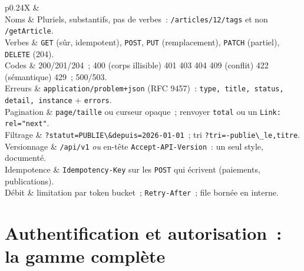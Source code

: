 \begin{tabz}{p{0.24\textwidth}X}
  \headrow {} \&  \\
  \midrule
  Noms \& Pluriels, substantifs, pas de verbes~: \verb|/articles/12/tags| et non \verb|/getArticle|. \\
  Verbes \& \verb|GET| (s\^ur, idempotent), \verb|POST|, \verb|PUT| (remplacement), \verb|PATCH| (partiel), \verb|DELETE| (204). \\
  Codes \& 200/201/204~; 400 (corps illisible) 401 403 404 409 (conflit) 422 (s\'emantique) 429~; 500/503. \\
  Erreurs \& \verb|application/problem+json| (RFC 9457)~: \verb|type, title, status, detail, instance| + \verb|errors|. \\
  Pagination \& \verb|page/taille| ou curseur opaque~; renvoyer \verb|total| ou un \verb|Link: rel="next"|. \\
  Filtrage \& \verb|?statut=PUBLIE\&depuis=2026-01-01|~; tri \verb|?tri=-publie\_le,titre|. \\
  Versionnage \& \verb|/api/v1| \emph{ou} en-t\^ete \verb|Accept-API-Version|~: un seul style, document\'e. \\
  Idempotence \& \verb|Idempotency-Key| sur les \verb|POST| qui \'ecrivent (paiements, publications). \\
  D\'ebit \& limitation par token bucket~; \verb|Retry-After|~; file born\'ee en interne. \\
\end{tabz}

\section{Authentification et autorisation~: la gamme compl\`ete}

